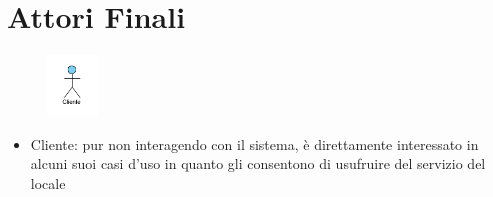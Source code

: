 \section{Attori Finali}
\begin{figure}[H]
	\centering
	\includegraphics[width=0.12\textwidth]{Immagini/AttoriFinali.png}
\end{figure}

\begin{itemize}
	\item Cliente: pur non interagendo con il sistema, è direttamente interessato in alcuni suoi casi d'uso in quanto gli consentono di usufruire del servizio del locale
\end{itemize}

